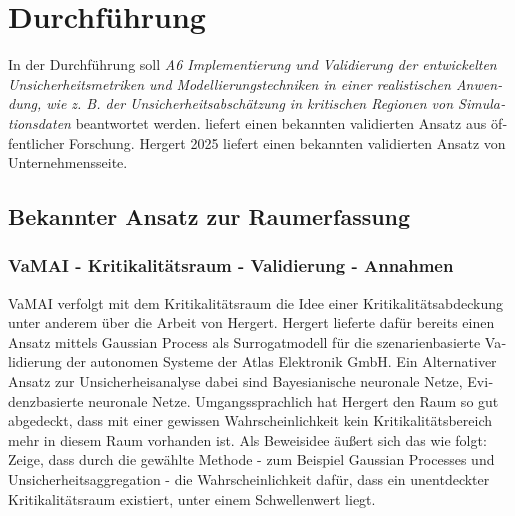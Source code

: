 
\chapter{Durchführung}\label{chapter:durchfuehrung}



\begin{otherlanguage}{american}
  
\end{otherlanguage}



\begin{otherlanguage}{ngerman}

In der Durchführung soll \textit{A6 Implementierung und Validierung der entwickelten Unsicherheitsmetriken
und Modellierungstechniken in einer realistischen Anwendung, wie z. B. der
Unsicherheitsabschätzung in kritischen Regionen von Simulationsdaten} beantwortet werden. \parencite{amini2020deep} liefert einen bekannten validierten Ansatz aus öffentlicher Forschung. Hergert 2025 liefert einen bekannten validierten Ansatz von Unternehmensseite. 

\section*{Bekannter Ansatz zur Raumerfassung}

\subsection*{VaMAI - Kritikalitätsraum - Validierung - Annahmen}

VaMAI verfolgt mit dem Kritikalitätsraum die Idee einer Kritikalitätsabdeckung unter anderem über die Arbeit von Hergert. Hergert lieferte dafür bereits einen Ansatz mittels \glqq{}Gaussian Process\grqq{} als Surrogatmodell für die szenarienbasierte Validierung der autonomen Systeme der Atlas Elektronik GmbH. Ein Alternativer Ansatz zur Unsicherheisanalyse dabei sind \gls{Bayesianische neuronale Netze}, \gls{Evidenzbasierte neuronale Netze}. Umgangssprachlich hat Hergert den Raum so gut abgedeckt, dass mit einer gewissen Wahrscheinlichkeit kein Kritikalitätsbereich mehr in diesem Raum vorhanden ist. Als Beweisidee äußert sich das wie folgt: Zeige, dass durch die gewählte Methode - zum Beispiel Gaussian Processes und Unsicherheitsaggregation - die Wahrscheinlichkeit dafür, dass ein unentdeckter Kritikalitätsraum existiert, unter einem Schwellenwert liegt.


\end{otherlanguage}
